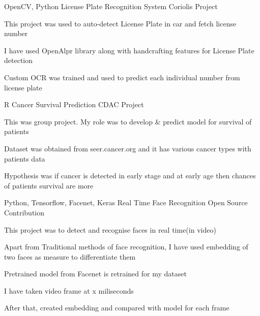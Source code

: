 \begin{cventries}
{    }
  \cventry
    {OpenCV, Python} %
    {License Plate Recognition System} %
    {Coriolis Project} %
    {} %
    {
      \begin{cvitems} %
        \item {This project was used to auto-detect License Plate in car and fetch license number}
        \item {I have used OpenAlpr library along with handcrafting features for License Plate detection}
        \item {Custom OCR was trained and used to predict each individual number from license plate}
      \end{cvitems}
    }

  \cventry
    {R} %
    {Cancer Survival Prediction} %
    {CDAC Project} %
    {} %
    {
      \begin{cvitems} %
        \item {This was group project. My role was  to develop \& predict model for survival of patients}
        \item {Dataset was obtained from seer.cancer.org and it has various cancer types with patients data}
        \item {Hypothesis was if cancer is detected in early stage and at early age 
               then chances of patients survival are more}
      \end{cvitems}
    }

  \cventry
    {Python, Tensorflow, Facenet, Keras} %
    {Real Time Face Recognition} %
    {Open Source Contribution} %
    {} %
    {
      \begin{cvitems} %
        \item {This project was to detect and recognise faces in real time(in video)}
        \item {Apart from Traditional methods of face recognition, I have used embedding of two faces as measure to differentiate them}
        \item {Pretrained model from Facenet is retrained for my dataset}
        \item {I have taken video frame at x miliseconds}
        \item {After that, created embedding and compared with model for each frame}
      \end{cvitems}
    }


\end{cventries}
